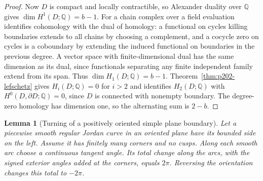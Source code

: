 \documentclass[11pt,oneside,openany]{book}
\theoremstyle{plain}
\newtheorem{lemma}[theorem]{Lemma}
\theoremstyle{definition}
\theoremstyle{remark}
\newcommand{\Q}{\mathbb Q}
\begin{document}
\begin{proof}
Now \(D\) is compact and locally contractible, so Alexander duality
over \(\Q\) gives \(\dim H^1(D;\Q)=b-1\). For a chain complex over a
field evaluation identifies cohomology with the dual of homology:
a functional on cycles killing boundaries extends to all chains by
choosing a complement, and a cocycle zero on cycles is a coboundary
by extending the induced functional on boundaries in the previous
degree. A vector space with finite-dimensional dual has the same
dimension as its dual, since functionals separating any finite
independent family extend from its span. Thus
\(\dim H_1(D;\Q)=b-1\). Theorem~\ref{thm:p202-lefschetz}
gives \(H_i(D;\Q)=0\) for \(i>2\) and identifies \(H_2(D;\Q)\) with
\(H^0(D,\partial D;\Q)=0\), since \(D\) is connected with nonempty
boundary. The degree-zero homology has dimension one, so the
alternating sum is \(2-b\).
\end{proof}

\begin{lemma}[Turning of a positively oriented simple plane boundary]
\label{lem:p202-plane-turning}
Let a piecewise smooth regular Jordan curve in an oriented plane
have its bounded side on the left. Assume it has finitely many
corners and no cusps. Along each smooth arc choose a continuous
tangent angle. Its total change along the arcs, with the signed
exterior angles added at the corners, equals \(2\pi\).
Reversing the orientation changes this total to \(-2\pi\).
\end{lemma}
\end{document}
